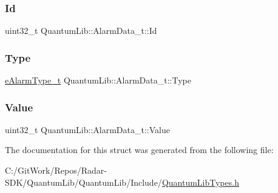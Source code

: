 \subsubsection{\texorpdfstring{Id}{Id}}
{\footnotesize\ttfamily uint32\+\_\+t Quantum\+Lib\+::\+Alarm\+Data\+\_\+t\+::\+Id}

\mbox{\label{struct_quantum_lib_1_1_alarm_data__t_afe1936d9430e6396dda2d40542e860ad}} 
\subsubsection{\texorpdfstring{Type}{Type}}
{\footnotesize\ttfamily \mbox{\hyperlink{namespace_quantum_lib_a63dd10ad28888fcad99c7b8c5f155750}{e\+Alarm\+Type\+\_\+t}} Quantum\+Lib\+::\+Alarm\+Data\+\_\+t\+::\+Type}

\mbox{\label{struct_quantum_lib_1_1_alarm_data__t_a067e24594147d5365c3b57e4920467bd}} 
\subsubsection{\texorpdfstring{Value}{Value}}
{\footnotesize\ttfamily uint32\+\_\+t Quantum\+Lib\+::\+Alarm\+Data\+\_\+t\+::\+Value}



The documentation for this struct was generated from the following file\+:\begin{DoxyCompactItemize}
\item 
C\+:/\+Git\+Work/\+Repos/\+Radar-\/\+S\+D\+K/\+Quantum\+Lib/\+Quantum\+Lib/\+Include/\mbox{\hyperlink{_quantum_lib_types_8h}{Quantum\+Lib\+Types.\+h}}\end{DoxyCompactItemize}
